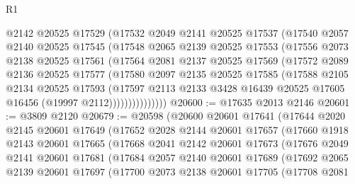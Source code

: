 \begin{lexlean}{R1}
\begin{coremodule}
              @2142
              @20525
              @17529
              (@17532
                @2049
                @2141
                @20525
                @17537
                (@17540
                  @2057
                  @2140
                  @20525
                  @17545
                  (@17548
                    @2065
                    @2139
                    @20525
                    @17553
                    (@17556
                      @2073
                      @2138
                      @20525
                      @17561
                      (@17564
                        @2081
                        @2137
                        @20525
                        @17569
                        (@17572
                          @2089
                          @2136
                          @20525
                          @17577
                          (@17580
                            @2097
                            @2135
                            @20525
                            @17585
                            (@17588
                              @2105
                              @2134
                              @20525
                              @17593
                              (@17597
                                @2113
                                @2133
                                @3428
                                @16439
                                @20525
                                @17605
                                @16456
                                (@19997 @2112)))))))))))))))
@20600 := @17635 @2013 @2146
@20601 := @3809 @2120
@20679 := @20598
    (@20600
      @20601
      @17641
      (@17644
        @2020
        @2145
        @20601
        @17649
        (@17652
          @2028
          @2144
          @20601
          @17657
          (@17660
            @1918
            @2143
            @20601
            @17665
            (@17668
              @2041
              @2142
              @20601
              @17673
              (@17676
                @2049
                @2141
                @20601
                @17681
                (@17684
                  @2057
                  @2140
                  @20601
                  @17689
                  (@17692
                    @2065
                    @2139
                    @20601
                    @17697
                    (@17700
                      @2073
                      @2138
                      @20601
                      @17705
                      (@17708
                        @2081

\end{coremodule}
\end{lexlean}
